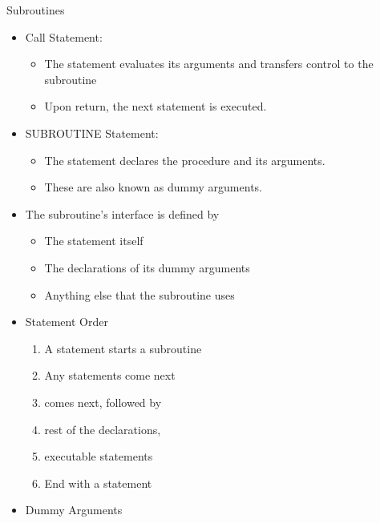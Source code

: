 \documentclass[10pt,t]{beamer}
\begin{document}
\begin{frame}{Subroutines}
  \begin{itemize}
    \item Call Statement: 
      \begin{itemize}
        \item The  statement evaluates its arguments and transfers control to the subroutine\\
        \item Upon return, the next statement is executed.
      \end{itemize}
    \item SUBROUTINE Statement:
      \begin{itemize}
        \item The  statement declares the procedure and its arguments.\\
        \item These are also known as dummy arguments.
      \end{itemize}
    \item The subroutine's interface is defined by
      \begin{itemize}
        \item The  statement itself
        \item The declarations of its dummy arguments
        \item Anything else that the subroutine uses
      \end{itemize}
      \framebreak
    \item Statement Order
      \begin{enumerate}
        \item A  statement starts a subroutine
        \item Any  statements come next
        \item {} comes next, followed by
        \item rest of the declarations,
        \item executable statements
        \item End with a  statement
      \end{enumerate}
    \item Dummy Arguments

\end{itemize}
\end{frame}
\end{document}
